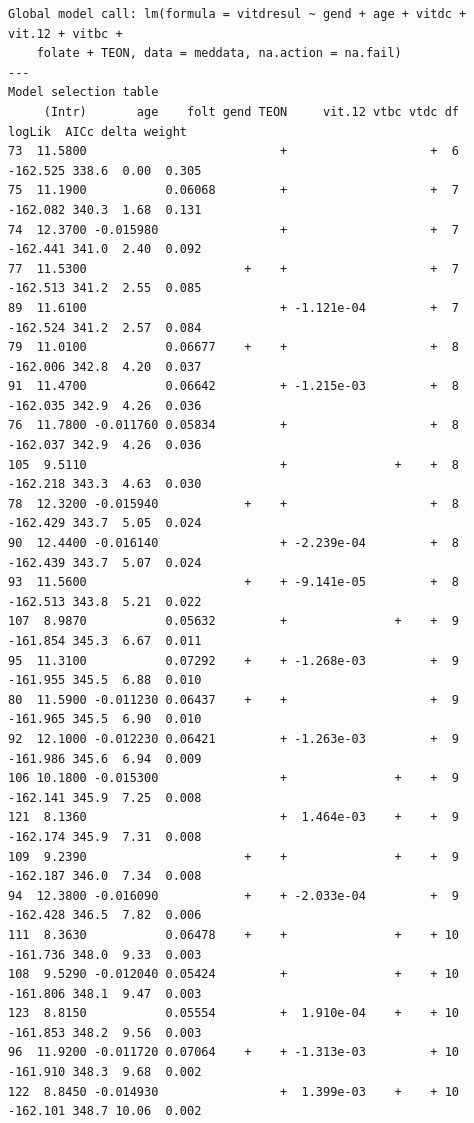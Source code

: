 \documentclass[
  oneside]{krantz}
\begin{document}
\begin{verbatim}
Global model call: lm(formula = vitdresul ~ gend + age + vitdc + vit.12 + vitbc + 
    folate + TEON, data = meddata, na.action = na.fail)
---
Model selection table 
     (Intr)       age    folt gend TEON     vit.12 vtbc vtdc df   logLik  AICc delta weight
73  11.5800                           +                    +  6 -162.525 338.6  0.00  0.305
75  11.1900           0.06068         +                    +  7 -162.082 340.3  1.68  0.131
74  12.3700 -0.015980                 +                    +  7 -162.441 341.0  2.40  0.092
77  11.5300                      +    +                    +  7 -162.513 341.2  2.55  0.085
89  11.6100                           + -1.121e-04         +  7 -162.524 341.2  2.57  0.084
79  11.0100           0.06677    +    +                    +  8 -162.006 342.8  4.20  0.037
91  11.4700           0.06642         + -1.215e-03         +  8 -162.035 342.9  4.26  0.036
76  11.7800 -0.011760 0.05834         +                    +  8 -162.037 342.9  4.26  0.036
105  9.5110                           +               +    +  8 -162.218 343.3  4.63  0.030
78  12.3200 -0.015940            +    +                    +  8 -162.429 343.7  5.05  0.024
90  12.4400 -0.016140                 + -2.239e-04         +  8 -162.439 343.7  5.07  0.024
93  11.5600                      +    + -9.141e-05         +  8 -162.513 343.8  5.21  0.022
107  8.9870           0.05632         +               +    +  9 -161.854 345.3  6.67  0.011
95  11.3100           0.07292    +    + -1.268e-03         +  9 -161.955 345.5  6.88  0.010
80  11.5900 -0.011230 0.06437    +    +                    +  9 -161.965 345.5  6.90  0.010
92  12.1000 -0.012230 0.06421         + -1.263e-03         +  9 -161.986 345.6  6.94  0.009
106 10.1800 -0.015300                 +               +    +  9 -162.141 345.9  7.25  0.008
121  8.1360                           +  1.464e-03    +    +  9 -162.174 345.9  7.31  0.008
109  9.2390                      +    +               +    +  9 -162.187 346.0  7.34  0.008
94  12.3800 -0.016090            +    + -2.033e-04         +  9 -162.428 346.5  7.82  0.006
111  8.3630           0.06478    +    +               +    + 10 -161.736 348.0  9.33  0.003
108  9.5290 -0.012040 0.05424         +               +    + 10 -161.806 348.1  9.47  0.003
123  8.8150           0.05554         +  1.910e-04    +    + 10 -161.853 348.2  9.56  0.003
96  11.9200 -0.011720 0.07064    +    + -1.313e-03         + 10 -161.910 348.3  9.68  0.002
122  8.8450 -0.014930                 +  1.399e-03    +    + 10 -162.101 348.7 10.06  0.002

\end{verbatim}
\end{document}
